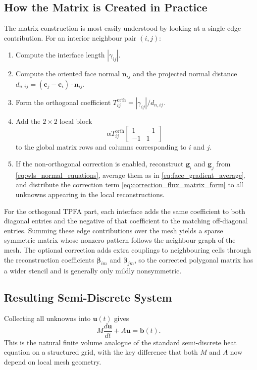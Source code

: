 \documentclass[11pt]{article}
\theoremstyle{plain}
\theoremstyle{definition}
\theoremstyle{remark}
\numberwithin{equation}{section}
\begin{document}
\subsection{How the Matrix is Created in Practice}
The matrix construction is most easily understood by looking at a single edge contribution. For an interior neighbour pair $(i,j)$:
\begin{enumerate}[label=\arabic*.]
\item Compute the interface length $|\gamma_{ij}|$.
\item Compute the oriented face normal $\bm{n}_{ij}$ and the projected normal distance $d_{n,ij} = (\bm{c}_j-\bm{c}_i)\cdot\bm{n}_{ij}$.
\item Form the orthogonal coefficient $T_{ij}^{\mathrm{orth}} = |\gamma_{ij}|/d_{n,ij}$.
\item Add the $2 \times 2$ local block
\begin{equation}
\label{eq:local_block}
\alpha T_{ij}^{\mathrm{orth}}
\begin{bmatrix}
1 & -1 \\
-1 & 1
\end{bmatrix}
\end{equation}
to the global matrix rows and columns corresponding to $i$ and $j$.
\item If the non-orthogonal correction is enabled, reconstruct $\bm{g}_i$ and $\bm{g}_j$ from \cref{eq:wls_normal_equations}, average them as in \cref{eq:face_gradient_average}, and distribute the correction term \cref{eq:correction_flux_matrix_form} to all unknowns appearing in the local reconstructions.
\end{enumerate}

For the orthogonal TPFA part, each interface adds the same coefficient to both diagonal entries and the negative of that coefficient to the matching off-diagonal entries. Summing these edge contributions over the mesh yields a sparse symmetric matrix whose nonzero pattern follows the neighbour graph of the mesh. The optional correction adds extra couplings to neighbouring cells through the reconstruction coefficients $\bm{\beta}_{im}$ and $\bm{\beta}_{jm}$, so the corrected polygonal matrix has a wider stencil and is generally only mildly nonsymmetric.

\subsection{Resulting Semi-Discrete System}
Collecting all unknowns into $\bm{u}(t)$ gives
\begin{equation}
\label{eq:semi_discrete_matrix}
M \frac{d\bm{u}}{dt} + A \bm{u} = \bm{b}(t).
\end{equation}
This is the natural finite volume analogue of the standard semi-discrete heat equation on a structured grid, with the key difference that both $M$ and $A$ now depend on local mesh geometry.
\end{document}
